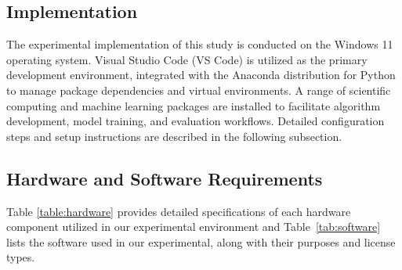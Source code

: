 \begin{ZhChapter}

    \chapter{Implementation}
    The experimental implementation of this study is conducted on the Windows 11 operating system. Visual Studio Code (VS Code) is utilized as the primary development environment, integrated with the Anaconda distribution for Python to manage package dependencies and virtual environments. A range of scientific computing and machine learning packages are installed to facilitate algorithm development, model training, and evaluation workflows. Detailed configuration steps and setup instructions are described in the following subsection.

    \section{Hardware  and Software Requirements}

    Table \ref{table:hardware} provides detailed specifications of each hardware component utilized in our experimental environment and Table~\ref{tab:software} lists the software used in our experimental, along with their purposes and license types.

    \begin{table}[htbp]
        \centering
        \caption{Hardware Requirements} \label{table:hardware}
    \end{table}


\end{ZhChapter}
